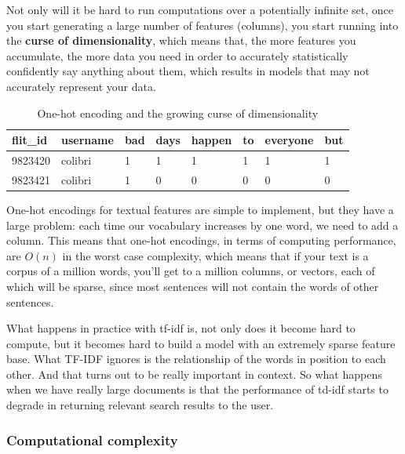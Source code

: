 \documentclass[11pt]{diazessay} %
\begin{document}
Not only will it be hard to run computations over a potentially infinite set, once you start generating a large number of features (columns), you start running into the \textbf{curse of dimensionality}, which means that, the more features you accumulate, the more data you need in order to accurately statistically confidently say anything about them, which results in models that may not accurately represent your data\citep{houle2010can}. 


\begin{table}[h!]
    \centering
    \caption{One-hot encoding and the growing curse of dimensionality}
\begin{tabular}{|l|l|l|l|l|l|l|l|}
\hline
\rowcolor[HTML]{EFEFEF} 
flit\_id & username & bad & days & happen & to & everyone & but \\ \hline
9823420  & colibri  & 1   & 1    & 1      & 1  & 1        & 1   \\ \hline
9823421  & colibri  & 1   & 0    & 0      & 0  & 0        & 0   \\ \hline
\end{tabular}
\end{table}

One-hot encodings for textual features are simple to implement, but they have a large problem: each time our vocabulary increases by one word, we need to add a column. This means that one-hot encodings, in terms of computing performance, are \begin{math}O(n)\end{math} in the worst case complexity, which means that if your text is a corpus of a million words, you'll get to a million columns, or vectors, each of which will be sparse, since most sentences will not contain the words of other sentences.   

What happens in practice with tf-idf is, not only does it become hard to compute, but it becomes hard to build a model with an extremely sparse feature base. What TF-IDF ignores is the relationship of the words in position to each other. And that turns out to be really important in context. So what happens when we have really large documents is that the performance of td-idf starts to degrade in returning relevant search results to the user. 
 
  \subsubsection{Computational complexity}
  
\end{document}

